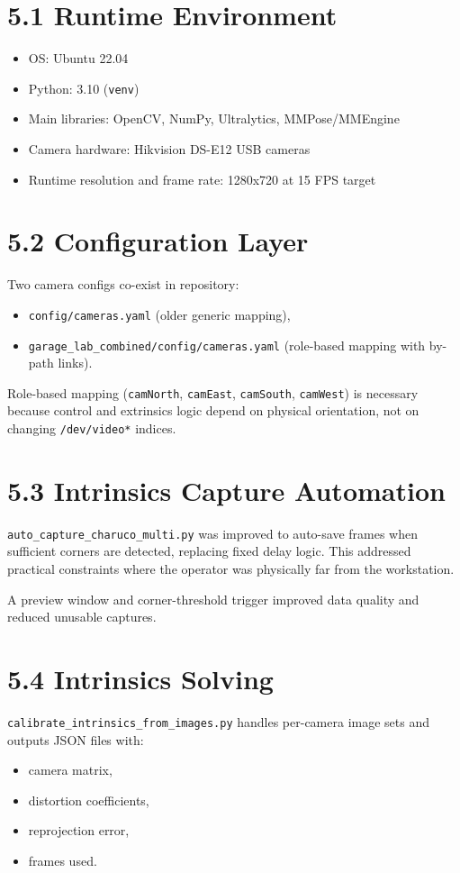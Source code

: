 \section{5.1 Runtime Environment}
\begin{itemize}
  \item OS: Ubuntu 22.04
  \item Python: 3.10 (\texttt{venv})
  \item Main libraries: OpenCV, NumPy, Ultralytics, MMPose/MMEngine
  \item Camera hardware: Hikvision DS-E12 USB cameras
  \item Runtime resolution and frame rate: 1280x720 at 15 FPS target
\end{itemize}

\section{5.2 Configuration Layer}
Two camera configs co-exist in repository:
\begin{itemize}
  \item \texttt{config/cameras.yaml} (older generic mapping),
  \item \texttt{garage\_lab\_combined/config/cameras.yaml} (role-based mapping with by-path links).
\end{itemize}

Role-based mapping (\texttt{camNorth}, \texttt{camEast}, \texttt{camSouth}, \texttt{camWest}) is necessary because control and extrinsics logic depend on physical orientation, not on changing \texttt{/dev/video*} indices.

\section{5.3 Intrinsics Capture Automation}
\texttt{auto\_capture\_charuco\_multi.py} was improved to auto-save frames when sufficient corners are detected, replacing fixed delay logic. This addressed practical constraints where the operator was physically far from the workstation.

A preview window and corner-threshold trigger improved data quality and reduced unusable captures.

\section{5.4 Intrinsics Solving}
\texttt{calibrate\_intrinsics\_from\_images.py} handles per-camera image sets and outputs JSON files with:
\begin{itemize}
  \item camera matrix,
  \item distortion coefficients,
  \item reprojection error,
  \item frames used.
\end{itemize}


